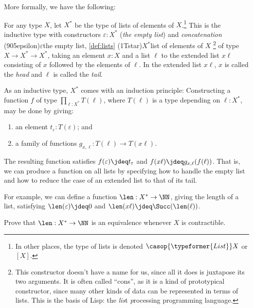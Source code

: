 More formally, we have the following:
\begin{definition}\label{def:lists}
  For any type $X$, let $X^*$ be the type of lists of elements of $X$.\footnote{%
    In other places, the type of lists is denoted $\casop{\typeformer{List}} X$
    or $[X]$.}
  This is the inductive type with constructors $\varepsilon : X^*$
  (\emph{the empty list}) and \emph{concatenation}%
  \glossary(905epsilon){$\varepsilon$}{the empty list, \cref{def:lists}}%
  \glossary(1Tstar){$X^*$}{list of elements of $X$}%
  \footnote{%
    This constructor doesn't have a name for us,
    since all it does is juxtapose its two arguments.
    It is often called ``cons'',
    as it is a kind of prototypical constructor,
    since many other kinds of data can be represented
    in terms of lists. This is the basis of Lisp:
    the \emph{lis}t \emph{p}rocessing programming language.}
  of type $X \to X^* \to X^*$,
  taking an element $x:X$ and a list $\ell$ to the extended list $x\ell$
  consisting of $x$ followed by the elements of $\ell$.
  In the extended list $x\ell$, $x$ is called the \emph{head}
  and $\ell$ is called the \emph{tail}.
\end{definition}

As an inductive type, $X^*$ comes with an induction principle:
Constructing a function $f$ of type $\prod_{\ell:X^*} T(\ell)$,
where $T(\ell)$ is a type depending on $\ell:X^*$,
may be done by giving:
\begin{enumerate}
\item an element $t_\varepsilon : T(\varepsilon)$; and
\item a family of functions $g_{x,\ell} : T(\ell) \to T(x\ell)$.
\end{enumerate}
The resulting function satisfies $f(\varepsilon) \jdeq t_\varepsilon$
and $f(x\ell) \jdeq g_{x,\ell}(f(\ell))$.
That is, we can produce a function on all lists by specifying how
to handle the empty list and how to reduce the case of an
extended list to that of its tail.

For example, we can define a function $\len : X^* \to \NN$,
giving the length of a list,
satisfying $\len(\varepsilon) \jdeq 0$ and $\len(x\ell) \jdeq \Succ(\len(\ell))$.

\begin{xca}\label{xca:list-contr}
  Prove that $\len : X^* \to \NN$ is an equivalence
  whenever $X$ is contractible.
\end{xca}

